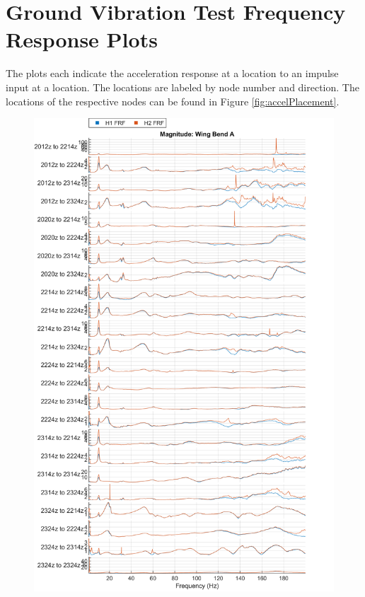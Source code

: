 \chapter{Ground Vibration Test Frequency Response Plots}
\label{ap:gvtPlots}

The plots each indicate the acceleration response at a location to an impulse input at a location. The locations are labeled by node number and direction. The locations of the respective nodes can be found in Figure \ref{fig:accelPlacement}.

\begin{figure}[H]
    \centering
    \includegraphics{figs/GVT/mag_Wing Bend A.png}
    \label{fig:mag_wingBendA}
\end{figure}
